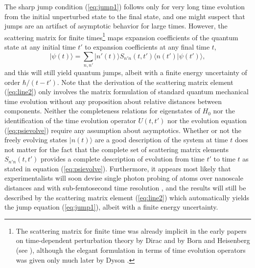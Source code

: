 \documentclass[final,3p,times,twocolumn]{elsarticle3}
\begin{document}
The sharp jump condition (\ref{eq:jump1}) follows only for very long time 
evolution from the initial unperturbed state to the final state, and one might 
suspect that jumps are an artifact of asymptotic behavior for large times. However, 
the scattering matrix for finite times\footnote{The scattering matrix for finite 
time was already implicit in the early papers on time-dependent perturbation theory 
by Dirac \cite{dirac1a,dirac1b} and by Born and Heisenberg (see \cite{BV,BC}), 
although the elegant formulation in terms of time evolution operators was given 
only much later by Dyson \cite{dyson}.} 
maps expansion coefficients of the quantum state at any initial time $t'$ to 
expansion coefficients at any final time $t$,
\begin{equation}\label{eq:psievolve}
\bm{|}\psi(t)\bm{\rangle}=\sum_{n,n'}\bm{|}n'(t)\bm{\rangle} 
S_{n'n}(t,t')\bm{\langle} n(t')\bm{|}\psi(t')\bm{\rangle},
\end{equation}
and this will still yield quantum jumps, albeit with a finite energy uncertainty
of order $\hbar/(t-t')$. Note that the derivation of the scattering matrix 
element (\ref{eq:line2}) only involves the matrix formulation of standard quantum 
mechanical time evolution without any proposition about relative distances between 
components. Neither the completeness relations for eigenstates of $H_0$ nor the 
identification of the time evolution operator $U(t,t')$ nor the evolution equation
(\ref{eq:psievolve}) require any assumption about asymptotics. 
Whether or not the freely evolving states $\bm{|}n(t)\bm{\rangle}$ are a good description 
of the system at time $t$ does not matter for the fact that the complete set of 
scattering matrix elements $S_{n'n}(t,t')$ provides a complete description of 
evolution from time $t'$ to time $t$ as stated in equation (\ref{eq:psievolve}).
 Furthermore, it appears most likely that experimentalists will soon devise single 
photon probing \cite{1pem1,1pem2,1pem3,1pspec1,1pspec2} of atoms over nanoscale 
distances and with sub-femtosecond time resolution \cite{atto1,atto2}, and the 
results will still be described by the scattering matrix element (\ref{eq:line2}) 
which automatically yields the jump equation (\ref{eq:jump1}), albeit with 
a finite energy uncertainty.
\end{document}
